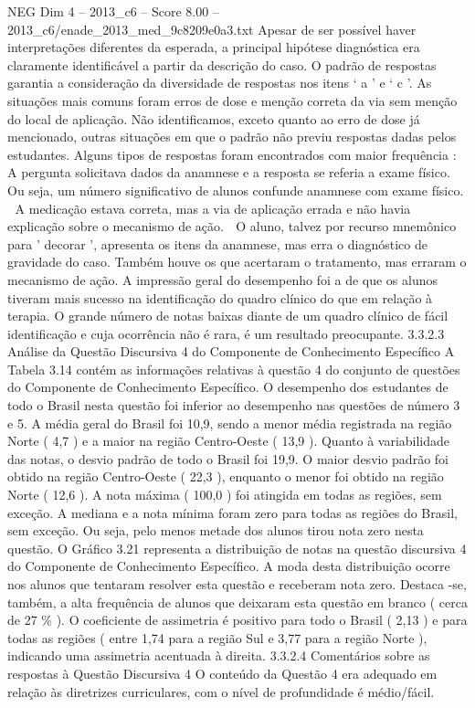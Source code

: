 \begin{textsample}{NEG Dim 4 – 2013\_c6 – Score 8.00 – 2013\_c6/enade\_2013\_med\_9c8209e0a3.txt}
Apesar de ser possível haver interpretações diferentes da esperada, a principal hipótese diagnóstica era claramente identificável a partir da descrição do caso.
O padrão de respostas garantia a consideração da diversidade de respostas nos itens ‘ a ’ e ‘ c ’.
As situações mais comuns foram erros de dose e menção correta da via sem menção do local de aplicação.
Não identificamos, exceto quanto ao erro de dose já mencionado, outras situações em que o padrão não previu respostas dadas pelos estudantes.
Alguns tipos de respostas foram encontrados com maior frequência :  A pergunta solicitava dados da anamnese e a resposta se referia a exame físico.
Ou seja, um número significativo de alunos confunde anamnese com exame físico.  A medicação estava correta, mas a via de aplicação errada e não havia explicação sobre o mecanismo de ação.  O aluno, talvez por recurso mnemônico para ' decorar ', apresenta os itens da anamnese, mas erra o diagnóstico de gravidade do caso.
Também houve os que acertaram o tratamento, mas erraram o mecanismo de ação.
A impressão geral do desempenho foi a de que os alunos tiveram mais sucesso na identificação do quadro clínico do que em relação à terapia.
O grande número de notas baixas diante de um quadro clínico de fácil identificação e cuja ocorrência não é rara, é um resultado preocupante. 3.3.2.3 Análise da Questão Discursiva 4 do Componente de Conhecimento Específico A Tabela 3.14 contém as informações relativas à questão 4 do conjunto de questões do Componente de Conhecimento Específico.
O desempenho dos estudantes de todo o Brasil nesta questão foi inferior ao desempenho nas questões de número 3 e 5.
A média geral do Brasil foi 10,9, sendo a menor média registrada na região Norte ( 4,7 ) e a maior na região Centro-Oeste ( 13,9 ).
Quanto à variabilidade das notas, o desvio padrão de todo o Brasil foi 19,9.
O maior desvio padrão foi obtido na região Centro-Oeste ( 22,3 ), enquanto o menor foi obtido na região Norte ( 12,6 ).
A nota máxima ( 100,0 ) foi atingida em todas as regiões, sem exceção.
A mediana e a nota mínima foram zero para todas as regiões do Brasil, sem exceção.
Ou seja, pelo menos metade dos alunos tirou nota zero nesta questão.
O Gráfico 3.21 representa a distribuição de notas na questão discursiva 4 do Componente de Conhecimento Específico.
A moda desta distribuição ocorre nos alunos que tentaram resolver esta questão e receberam nota zero.
Destaca -se, também, a alta frequência de alunos que deixaram esta questão em branco ( cerca de 27 \% ).
O coeficiente de assimetria é positivo para todo o Brasil ( 2,13 ) e para todas as regiões ( entre 1,74 para a região Sul e 3,77 para a região Norte ), indicando uma assimetria acentuada à direita. 3.3.2.4 Comentários sobre as respostas à Questão Discursiva 4 O conteúdo da Questão 4 era adequado em relação às diretrizes curriculares, com o nível de profundidade é médio/fácil.

\end{textsample}
